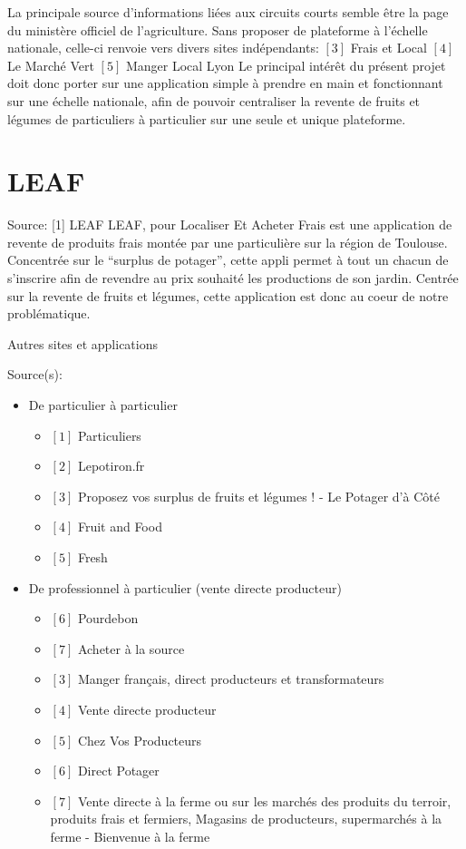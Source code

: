 La principale source d’informations liées aux circuits courts semble être la page du ministère officiel de l’agriculture. Sans proposer de plateforme à l’échelle nationale, celle-ci renvoie vers divers sites indépendants:
	$[3]$ Frais et Local
	$[4]$ Le Marché Vert
	$[5]$ Manger Local Lyon
Le principal intérêt du présent projet doit donc porter sur une application simple à prendre en main et fonctionnant sur une échelle nationale, afin de pouvoir centraliser la revente de fruits et légumes de particuliers à particulier sur une seule et unique plateforme.


\section*{LEAF}
	Source: [1] LEAF
LEAF, pour Localiser Et Acheter Frais est une application de revente de produits frais montée par une particulière sur la région de Toulouse. Concentrée sur le “surplus de potager”, cette appli permet à tout un chacun de s’inscrire afin de revendre au prix souhaité les productions de son jardin.
Centrée sur la revente de fruits et légumes, cette application est donc au coeur de notre problématique.

Autres sites et applications

	Source(s):
\begin{itemize}
	\item De particulier à particulier
	\begin{itemize}
		\item $[1]$ Particuliers
		\item $[2]$ Lepotiron.fr
		\item $[3]$ Proposez vos surplus de fruits et légumes ! - Le Potager d'à Côté
		\item $[4]$ Fruit and Food
		\item $[5]$ Fresh
	\end{itemize}

	\item De professionnel à particulier (vente directe producteur)
	\begin{itemize}
		\item $[6]$ Pourdebon
		\item $[7]$ Acheter à la source
		\item $[3]$ Manger français, direct producteurs et transformateurs
		\item $[4]$ Vente directe producteur
		\item $[5]$ Chez Vos Producteurs
		\item $[6]$ Direct Potager
		\item $[7]$ Vente directe à la ferme ou sur les marchés des produits du terroir, produits frais et fermiers, Magasins de producteurs, supermarchés à la ferme - Bienvenue à la ferme
	\end{itemize}

\end{itemize}


